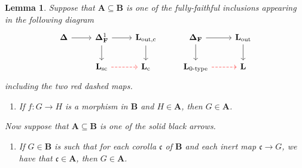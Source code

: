 \documentclass{amsart}
\numberwithin{theorem}{subsection}
\newtheorem{lemma}[theorem]{Lemma}
\theoremstyle{definition}
\newcommand{\finsetskel}{\mathbf{F}}
\newcommand{\xfc}{\mathfrak{c}}
\newcommand{\name}[1]{\ensuremath{\text{\textup{#1}}}}
\newcommand{\simp}{\mathbf{\Delta}}
\newcommand{\levelg}{\mathbf{L}}
\newcommand{\levelgconn}{\levelg_{\name{c}}}
\begin{document}
\begin{lemma}\label{lem comparison between levelgraph cats}
Suppose that $\mathbf{A} \subseteq \mathbf{B}$ is one of the fully-faithful inclusions appearing in the following diagram
\[ \begin{tikzcd}
\simp \rar & \simp_\finsetskel^1 \rar \dar & \levelg_{\name{out,c}} \dar & \simp_\finsetskel \rar \dar & \levelg_{\name{out}} \dar  \\
& \levelg_{\name{sc}} \rar[dashed, color=red] & \levelgconn & \levelg_{\name{0-type}}\rar[dashed, color=red]  & \levelg
\end{tikzcd} \]
including the two {\color{red} red dashed} maps.
\begin{enumerate}[label=(\arabic*), ref={\arabic*}]
	\item If $f \colon G \to H$ is a morphism in $\mathbf{B}$ and $H \in \mathbf{A}$, then $G\in \mathbf{A}$.\label{item one comparison between levelgraph cats}
\end{enumerate}
\noindent
Now suppose that $\mathbf{A} \subseteq \mathbf{B}$ is one of the solid black arrows.
\begin{enumerate}[resume*]
	\item If $G\in \mathbf{B}$ is such that for each corolla $\xfc$ of $\mathbf{B}$ and each inert map $\xfc \to G$, we have that $\xfc \in \mathbf{A}$, then $G\in \mathbf{A}$.\label{item two comparison between levelgraph cats}
\end{enumerate}
\end{lemma}
\end{document}
